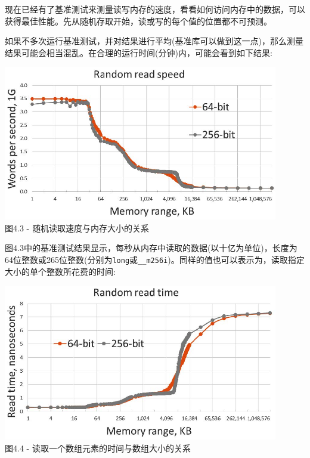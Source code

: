 
现在已经有了基准测试来测量读写内存的速度，看看如何访问内存中的数据，可以获得最佳性能。先从随机存取开始，读或写的每个值的位置都不可预测。


如果不多次运行基准测试，并对结果进行平均(基准库可以做到这一点)，那么测量结果可能会相当混乱。在合理的运行时间(分钟)内，可能会看到如下结果:

\begin{center}
\includegraphics[width=0.9\textwidth]{content/1/chapter4/images/3.jpg}\\
图4.3 - 随机读取速度与内存大小的关系
\end{center}

图4.3中的基准测试结果显示，每秒从内存中读取的数据(以十亿为单位)，长度为64位整数或265位整数(分别为\texttt{long}或\texttt{\_\_m256i})。同样的值也可以表示为，读取指定大小的单个整数所花费的时间:

\begin{center}
\includegraphics[width=0.9\textwidth]{content/1/chapter4/images/4.jpg}\\
图4.4 - 读取一个数组元素的时间与数组大小的关系
\end{center}


